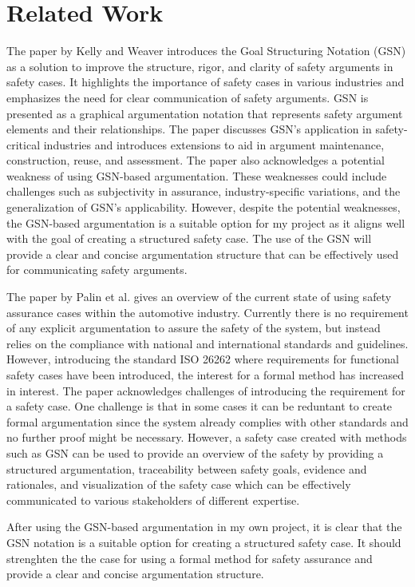 \section*{Related Work}
    The paper by Kelly and Weaver \cite{kelly2004goal} introduces the Goal Structuring Notation (GSN) as a solution to improve the structure, rigor, and clarity of safety arguments in safety cases. It highlights the importance of safety cases in various industries and emphasizes the need for clear communication of safety arguments. GSN is presented as a graphical argumentation notation that represents safety argument elements and their relationships. The paper discusses GSN's application in safety-critical industries and introduces extensions to aid in argument maintenance, construction, reuse, and assessment. The paper also acknowledges a potential weakness of using GSN-based argumentation. These weaknesses could include challenges such as subjectivity in assurance, industry-specific variations, and the generalization of GSN's applicability. However, despite the potential weaknesses, the GSN-based argumentation is a suitable option for my project as it aligns well with the goal of creating a structured safety case. The use of the GSN will provide a clear and concise argumentation structure that can be effectively used for communicating safety arguments.
    
    The paper by Palin et al. \cite{palin2011iso} gives an overview of the current state of using safety assurance cases within the automotive industry. Currently there is no requirement of any explicit argumentation to assure the safety of the system, but instead relies on the compliance with national and international standards and guidelines. However, introducing the standard ISO 26262 where requirements for functional safety cases have been introduced, the interest for a formal method has increased in interest. The paper acknowledges challenges of introducing the requirement for a safety case. One challenge is that in some cases it can be reduntant to create formal argumentation since the system already complies with other standards and no further proof might be necessary. However, a safety case created with methods such as GSN can be used to provide an overview of the safety by providing a structured argumentation, traceability between safety goals, evidence and rationales, and visualization of the safety case which can be effectively communicated to various stakeholders of different expertise. 
    
    After using the GSN-based argumentation in my own project, it is clear that the GSN notation is a suitable option for creating a structured safety case. It should strenghten the the case for using a formal method for safety assurance and provide a clear and concise argumentation structure.

    
